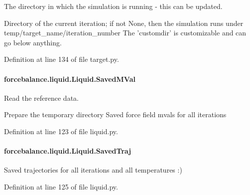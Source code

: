 The directory in which the simulation is running -\/ this can be updated. 

Directory of the current iteration; if not None, then the simulation runs under temp/target\-\_\-name/iteration\-\_\-number The 'customdir' is customizable and can go below anything.

Definition at line 134 of file target.\-py.

\hypertarget{classforcebalance_1_1liquid_1_1Liquid_a5b9df1bf79a641156429e292f47b6afd}{
\paragraph[{Saved\-M\-Val}]{\setlength{\rightskip}{0pt plus 5cm}forcebalance.\-liquid.\-Liquid.\-Saved\-M\-Val\hspace{0.3cm}{\ttfamily [inherited]}}}\label{classforcebalance_1_1liquid_1_1Liquid_a5b9df1bf79a641156429e292f47b6afd}


Read the reference data. 

Prepare the temporary directory Saved force field mvals for all iterations 

Definition at line 123 of file liquid.\-py.

\hypertarget{classforcebalance_1_1liquid_1_1Liquid_a0da0c00cdc193c9c470d7e528043fb99}{
\paragraph[{Saved\-Traj}]{\setlength{\rightskip}{0pt plus 5cm}forcebalance.\-liquid.\-Liquid.\-Saved\-Traj\hspace{0.3cm}{\ttfamily [inherited]}}}\label{classforcebalance_1_1liquid_1_1Liquid_a0da0c00cdc193c9c470d7e528043fb99}


Saved trajectories for all iterations and all temperatures \-:) 



Definition at line 125 of file liquid.\-py.

